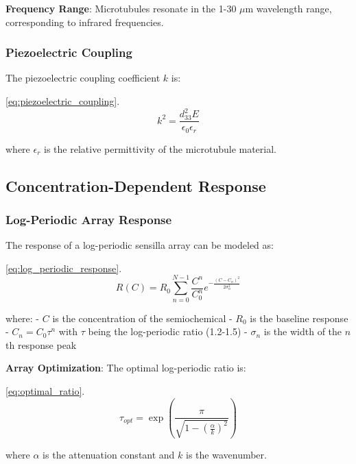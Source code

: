 \documentclass[
  13pt,
  a4paperpaper,
  12pt]{article}
\begin{document}
\textbf{Frequency Range}: Microtubules resonate in the 1-30
\(\mu\mathrm{m}\) wavelength range, corresponding to infrared
frequencies.

\subsubsection{Piezoelectric Coupling}\label{piezoelectric-coupling}

The piezoelectric coupling coefficient \(k\) is:

\eqref{eq:piezoelectric_coupling}. \begin{equation}
k^2 = \frac{d_{33}^2 E}{\epsilon_0 \epsilon_r} \label{eq:piezoelectric_coupling}
\end{equation}

where \(\epsilon_r\) is the relative permittivity of the microtubule
material.

\subsection{Concentration-Dependent
Response}\label{concentration-dependent-response}

\subsubsection{Log-Periodic Array
Response}\label{log-periodic-array-response}

The response of a log-periodic sensilla array can be modeled as:

\eqref{eq:log_periodic_response}. \begin{equation}
R(C) = R_0 \sum_{n=0}^{N-1} \frac{C^n}{C_0^n} e^{-\frac{(C - C_n)^2}{2\sigma_n^2}} \label{eq:log_periodic_response}
\end{equation}

where: - \(C\) is the concentration of the semiochemical - \(R_0\) is
the baseline response - \(C_n = C_0 \tau^n\) with \(\tau\) being the
log-periodic ratio (1.2-1.5) - \(\sigma_n\) is the width of the \(n\)th
response peak

\textbf{Array Optimization}: The optimal log-periodic ratio is:

\eqref{eq:optimal_ratio}. \begin{equation}
\tau_{opt} = \exp\left(\frac{\pi}{\sqrt{1 - \left(\frac{\alpha}{k}\right)^2}}\right) \label{eq:optimal_ratio}
\end{equation}

where \(\alpha\) is the attenuation constant and \(k\) is the
wavenumber.
\end{document}
